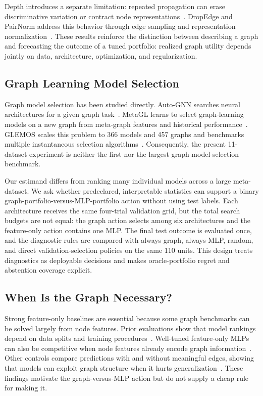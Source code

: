 Depth introduces a separate limitation: repeated propagation can erase discriminative variation or contract node representations~\citep{oono2020exponential,chen2020measuring}. DropEdge and PairNorm address this behavior through edge sampling and representation normalization~\citep{rong2020dropedge,zhao2020pairnorm}. These results reinforce the distinction between describing a graph and forecasting the outcome of a tuned portfolio: realized graph utility depends jointly on data, architecture, optimization, and regularization.

\subsection{Graph Learning Model Selection}

Graph model selection has been studied directly. Auto-GNN searches neural architectures for a given graph task~\citep{zhou2020autognn}. MetaGL learns to select graph-learning models on a new graph from meta-graph features and historical performance~\citep{park2023metagl}. GLEMOS scales this problem to 366 models and 457 graphs and benchmarks multiple instantaneous selection algorithms~\citep{park2023glemos}. Consequently, the present 11-dataset experiment is neither the first nor the largest graph-model-selection benchmark.

Our estimand differs from ranking many individual models across a large meta-dataset. We ask whether predeclared, interpretable statistics can support a binary graph-portfolio-versus-MLP-portfolio action without using test labels. Each architecture receives the same four-trial validation grid, but the total search budgets are not equal: the graph action selects among six architectures and the feature-only action contains one MLP. The final test outcome is evaluated once, and the diagnostic rules are compared with always-graph, always-MLP, random, and direct validation-selection policies on the same 110 units. This design treats diagnostics as deployable decisions and makes oracle-portfolio regret and abstention coverage explicit.

\subsection{When Is the Graph Necessary?}

Strong feature-only baselines are essential because some graph benchmarks can be solved largely from node features. Prior evaluations show that model rankings depend on data splits and training procedures~\citep{shchur2018pitfalls}. Well-tuned feature-only MLPs can also be competitive when node features already encode graph information~\citep{katsman2026necessary}. Other controls compare predictions with and without meaningful edges, showing that models can exploit graph structure when it hurts generalization~\citep{bechler2024graphs}. These findings motivate the graph-versus-MLP action but do not supply a cheap rule for making it.

